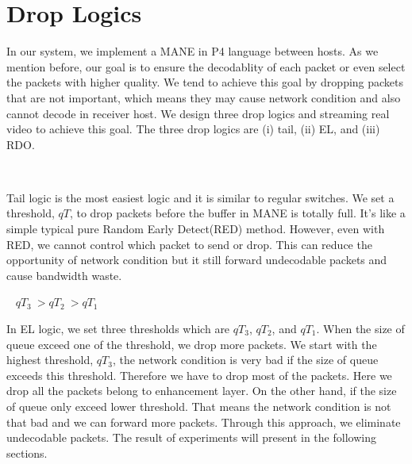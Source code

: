 \section{Drop Logics} \label{sec:dropLogics}

In our system, we implement a MANE in P4 language between hosts. As we mention before, our goal is to ensure the decodablity of each packet or even select the packets with higher quality. We tend to achieve this goal by dropping packets that are not important, which means they may cause network condition and also cannot decode in receiver host. We design three drop logics and streaming real video to achieve this goal. The three drop logics are (i) tail, (ii) EL, and (iii) RDO. 

\begin{algorithm}
    \begin{algorithmic}[1]
         
        \Else \ 
        \EndIf
        \EndProcedure
    \end{algorithmic}
\end{algorithm}

Tail logic is the most easiest logic and it is similar to regular switches. We set a threshold, $qT$, to drop packets before the buffer in MANE is totally full. It's like a simple typical pure Random Early Detect(RED) method. However, even with RED, we cannot control which packet to send or drop. This can reduce the opportunity of network condition but it still forward undecodable packets and cause bandwidth waste.

\begin{algorithm}
    \begin{algorithmic}[1]
         
        \Else 
             
            \Else 
                 
                \Else \ 
                \EndIf
            \EndIf
        \EndIf
    $qT_3\ > qT_2\ > qT_1$
        \EndProcedure
    \end{algorithmic}
\end{algorithm}

In EL logic, we set three thresholds which are $qT_3$, $qT_2$, and $qT_1$. When the size of queue exceed one of the threshold, we drop more packets. We start with the highest threshold, $qT_3$, the network condition is very bad if the size of queue exceeds this threshold. Therefore we have to drop most of the packets. Here we drop all the packets belong to enhancement layer. On the other hand, if the size of queue only exceed lower threshold. That means the network condition is not that bad and we can forward more packets. Through this approach, we eliminate undecodable packets. The result of experiments will present in the following sections.

